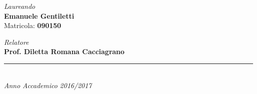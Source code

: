 \begin{titlepage}
\begin{minipage}[t]{0.47\textwidth}
    \begin{center}
    {\Large{\textsl{Laureando}
    \vspace{0.2cm}\\
    \textbf{Emanuele Gentiletti}\\
    \vspace{1.7cm}
    Matricola: \textbf{090150}
    }}

    \end{center}
\end{minipage}
\hfill
\begin{minipage}[t]{0.47\textwidth}
    \begin{center}
    {\Large{\textsl{Relatore}
    \vspace{0.2cm}\\
    \bf Prof. Diletta Romana Cacciagrano\\
    }}

    \end{center}
\end{minipage}
\vspace{23mm}
\begin{center}
\rule[0.1cm]{14cm}{0.1mm}\\
\vspace{2mm}
{\large{\textsl{Anno Accademico 2016/2017}}}
\end{center}
\end{titlepage}
\restoregeometry
\clearpage
\cleardoublepage

